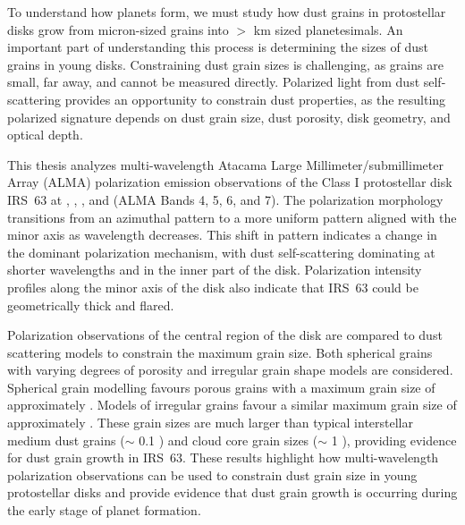 

To understand how planets form, we must study how dust grains in protostellar disks grow from micron-sized grains into $>$ km sized planetesimals.  An important part of understanding this process is determining the sizes of dust grains in young disks. Constraining dust grain sizes is challenging, as grains are small, far away, and cannot be measured directly. Polarized light from dust self-scattering provides an opportunity to constrain dust properties, as the resulting polarized signature depends on dust grain size, dust porosity, disk geometry, and optical depth.  

This thesis analyzes multi-wavelength Atacama Large Millimeter/submillimeter Array (ALMA) polarization emission observations of the Class I protostellar disk IRS~63 at \bfourNS, \bfiveNS, \bsixNS, and \bseven (ALMA Bands 4, 5, 6, and 7). The polarization morphology transitions from an azimuthal pattern to a more uniform pattern aligned with the minor axis as wavelength decreases. This shift in pattern indicates a change in the dominant polarization mechanism, with dust self-scattering dominating at shorter wavelengths and in the inner part of the disk. Polarization intensity profiles along the minor axis of the disk also indicate that IRS~63 could be geometrically thick and flared.


Polarization observations of the central region of the disk are compared to dust scattering models to constrain the maximum grain size. Both spherical grains with varying degrees of porosity and irregular grain shape models are considered. Spherical grain modelling favours porous grains with a maximum grain size of approximately \sbestNS. Models of irregular grains favour a similar maximum grain size of approximately \ibestNS. These grain sizes are much larger than typical interstellar medium dust grains ($\sim$ 0.1 \micronNS) and cloud core grain sizes ($\sim$ 1 \micronNS), providing evidence for dust grain growth in IRS~63. These results highlight how multi-wavelength polarization observations can be used to constrain dust grain size in young protostellar disks and provide evidence that dust grain growth is occurring during the early stage of planet formation.
